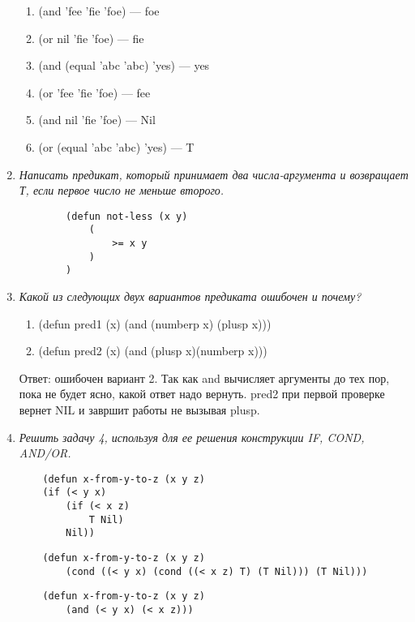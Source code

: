 \begin{enumerate}[wide=0pt]
		\begin{enumerate}[label=\arabic*)]
			\item (and 'fee 'fie 'foe) --- foe
			\item (or nil 'fie 'foe) --- fie
			\item (and (equal 'abc 'abc) 'yes) --- yes
			\item (or 'fee 'fie 'foe) --- fee
			\item (and nil 'fie 'foe) --- Nil
			\item (or (equal 'abc 'abc) 'yes) --- T
		\end{enumerate}

	\item  \textit{Написать предикат, который принимает два числа-аргумента и 
	возвращает Т, если первое число не меньше второго.}

	\begin{lstlisting}
		(defun not-less (x y)
			(
				>= x y
			)
		)
	\end{lstlisting}

	\item  \textit{Какой из следующих двух вариантов предиката ошибочен и почему?}
	
		\begin{enumerate}[label=\arabic*)]
			\item (defun pred1 (x) (and (numberp x) (plusp x)))
			\item (defun pred2 (x) (and (plusp x)(numberp x)))
		\end{enumerate}

		Ответ: ошибочен вариант 2. Так как and вычисляет аргументы до тех пор,
		пока не будет ясно, какой ответ надо вернуть. pred2 при первой проверке
		вернет NIL и завршит работы не вызывая plusp.

	\item  \textit{Решить задачу 4, используя для ее решения конструкции IF, COND,
	AND/OR.}
	
	\begin{lstlisting}
	(defun x-from-y-to-z (x y z)
	(if (< y x)
		(if (< x z)
			T Nil)
		Nil))
	\end{lstlisting}

	\begin{lstlisting}
	(defun x-from-y-to-z (x y z)
		(cond ((< y x) (cond ((< x z) T) (T Nil))) (T Nil)))
	\end{lstlisting}

	\begin{lstlisting}
	(defun x-from-y-to-z (x y z)
		(and (< y x) (< x z)))
	\end{lstlisting}



\end{enumerate}
